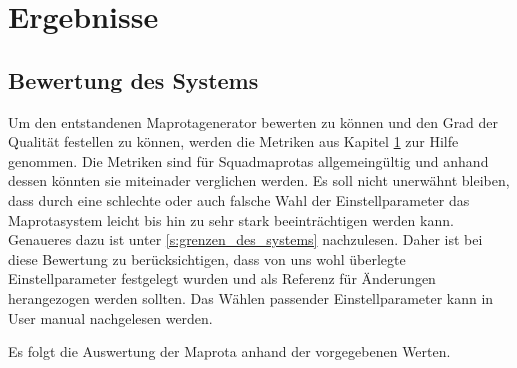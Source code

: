 \section{Ergebnisse}
    
    \subsection{Bewertung des Systems}
        \label{sec:bewerten_des_systems}
        Um den entstandenen Maprotagenerator bewerten zu können und den Grad der Qualität festellen zu können, 
        werden die Metriken aus Kapitel \ref{}  zur Hilfe genommen. Die Metriken sind für Squadmaprotas
        allgemeingültig und anhand dessen könnten sie miteinader verglichen werden. Es soll nicht unerwähnt bleiben,
        dass durch eine schlechte oder auch falsche Wahl der Einstellparameter das Maprotasystem leicht bis hin zu 
        sehr stark beeinträchtigen werden kann. Genaueres dazu ist unter \ref{s:grenzen_des_systems} nachzulesen.
        Daher ist bei diese Bewertung zu berücksichtigen, dass von uns wohl überlegte Einstellparameter festgelegt wurden
        und als Referenz für Änderungen herangezogen werden sollten.
        Das Wählen passender Einstellparameter kann in User manual nachgelesen werden.
   
        Es folgt die Auswertung der Maprota anhand der vorgegebenen Werten.\\


